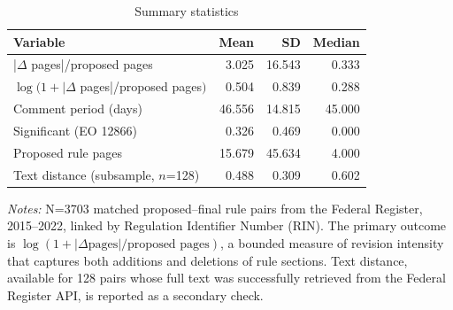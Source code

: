 \begin{table}[t]
\caption{Summary statistics}
\label{tab:summary}
\centering
\small
\begin{tabular}{lrrr}
\toprule
Variable & Mean & SD & Median \\
\midrule
|$\Delta$ pages|/proposed pages & 3.025 & 16.543 & 0.333 \\
$\log(1 + |\Delta$ pages|/proposed pages$)$ & 0.504 & 0.839 & 0.288 \\
Comment period (days) & 46.556 & 14.815 & 45.000 \\
Significant (EO 12866) & 0.326 & 0.469 & 0.000 \\
Proposed rule pages & 15.679 & 45.634 & 4.000 \\
Text distance (subsample, $n$=128) & 0.488 & 0.309 & 0.602 \\
\bottomrule
\end{tabular}
\begin{flushleft}\footnotesize \textit{Notes:} N=3703 matched proposed--final rule pairs from the Federal Register, 2015--2022, linked by Regulation Identifier Number (RIN). The primary outcome is $\log(1 + |\Delta\text{pages}|/\text{proposed pages})$, a bounded measure of revision intensity that captures both additions and deletions of rule sections. Text distance, available for 128 pairs whose full text was successfully retrieved from the Federal Register API, is reported as a secondary check. \end{flushleft}
\end{table}
